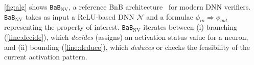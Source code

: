 \documentclass[oneside,11pt,dvipsnames]{book}
\newcommand{\nnproofformat}{\texttt{APTP}}
\newcommand{\dd}{\texttt{BaB$_{\text{NV}}$}}
\begin{document}
\autoref{fig:alg} shows \dd{}, a reference BnB architecture~\cite{nakagawa2014consolidating} for modern DNN verifiers. \dd{} takes as input a ReLU-based DNN $\mathcal{N}$ and a formulae $\phi_{in}\Rightarrow \phi_{out}$ representing the property of interest.
\dd{} iterates between (i) branching (\autoref{line:decide}), which \emph{decides} (assigns) an activation status value for a neuron, and (ii) bounding (\autoref{line:deduce}), which \emph{deduces} or checks the feasibility of the current activation pattern. 
\end{document}
